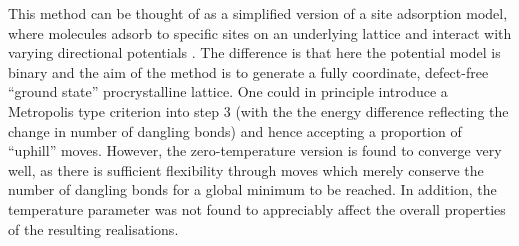 This method can be thought of as a simplified version of a site adsorption model, where molecules adsorb to specific sites on an underlying lattice and interact with varying directional potentials \cite{Gorbunov2017,Nieckarz2018,Buzano2004}.
The difference is that here the potential model is binary and the aim of the method is to generate a fully coordinate, defect\--free ``ground state'' procrystalline lattice.
One could in principle introduce a Metropolis type criterion into step 3 (with the the energy difference reflecting the change in number of dangling bonds) and hence accepting a proportion of ``uphill'' moves.
However, the zero\--temperature version is found to converge very well, as there is sufficient flexibility through moves which merely conserve the number of dangling bonds for a global minimum to be reached.
In addition, the temperature parameter was not found to appreciably affect the overall properties of the resulting realisations.

